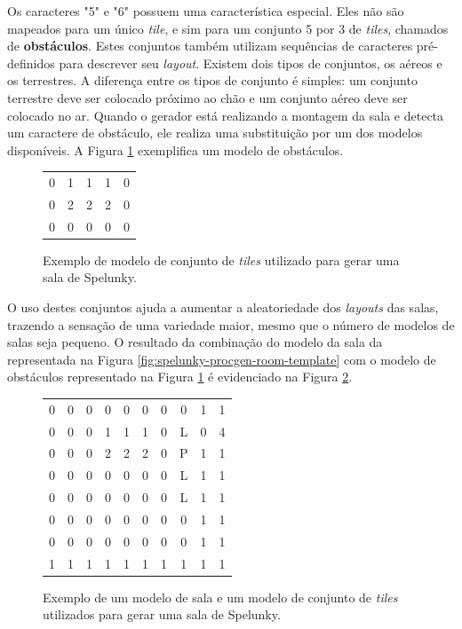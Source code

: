 Os caracteres "5" e "6" possuem uma característica especial. Eles não são
mapeados para um único \textit{tile}, e sim para um conjunto 5 por 3 de
\textit{tiles}, chamados de \textbf{obstáculos}. Estes conjuntos também utilizam
sequências de caracteres pré-definidos para descrever seu \textit{layout}.
Existem dois tipos de conjuntos, os aéreos e os terrestres. A diferença entre os
tipos de conjunto é simples: um conjunto terrestre deve ser colocado próximo ao
chão e um conjunto aéreo deve ser colocado no ar. Quando o gerador está
realizando a montagem da sala e detecta um caractere de obstáculo, ele realiza
uma substituição por um dos modelos disponíveis. A Figura
\ref{fig:spelunky-procgen-room-chunk} exemplifica um modelo de obstáculos.

\begin{figure}[htb!]
\centering
\begin{tabular}{c c c c c}
    0 & 1 & 1 & 1 & 0 \\
    0 & 2 & 2 & 2 & 0 \\
    0 & 0 & 0 & 0 & 0
\end{tabular}
\caption{\label{fig:spelunky-procgen-room-chunk}Exemplo de modelo de conjunto de
\textit{tiles} utilizado para gerar uma sala de Spelunky.}
\end{figure}

O uso destes conjuntos ajuda a aumentar a aleatoriedade dos \textit{layouts} das
salas, trazendo a sensação de uma variedade maior, mesmo que o número de modelos
de salas seja pequeno. O resultado da combinação do modelo da sala da
representada na Figura \ref{fig:spelunky-procgen-room-template} com o modelo de
obstáculos representado na Figura \ref{fig:spelunky-procgen-room-chunk} é
evidenciado na Figura \ref{fig:spelunky-procgen-room-combination}.

\begin{figure}[htb!]
\centering
\begin{tabular}{c c c c c c c c c c}
    0 & 0 & 0 & 0 & 0 & 0 & 0 & 0 & 1 & 1 \\
    0 & 0 & 0 & 1 & 1 & 1 & 0 & L & 0 & 4 \\
    0 & 0 & 0 & 2 & 2 & 2 & 0 & P & 1 & 1 \\
    0 & 0 & 0 & 0 & 0 & 0 & 0 & L & 1 & 1 \\
    0 & 0 & 0 & 0 & 0 & 0 & 0 & L & 1 & 1 \\
    0 & 0 & 0 & 0 & 0 & 0 & 0 & 0 & 1 & 1 \\
    0 & 0 & 0 & 0 & 0 & 0 & 0 & 0 & 1 & 1 \\
    1 & 1 & 1 & 1 & 1 & 1 & 1 & 1 & 1 & 1 \\
\end{tabular}
\caption{\label{fig:spelunky-procgen-room-combination}Exemplo de um modelo de
sala e um modelo de conjunto de \textit{tiles} utilizados para gerar uma sala de
Spelunky.}
\end{figure}


